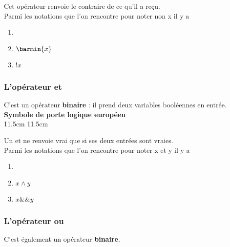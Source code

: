 \documentclass[a5paper,12pt,french]{book}
\begin{document}
Cet opérateur renvoie \og le contraire de ce qu'il a reçu\fg{}.\\
Parmi les notations que l'on rencontre pour noter \og non x\fg{} il y a
\begin{enumerate}[\textbullet]
	\item 	 {}
	\item 	$\barmin{x}$
	\item 	$!x$
\end{enumerate}
\newpage

\subsubsection*{L'opérateur \og et\fg{}}

C'est un opérateur \textbf{binaire} : il prend deux variables booléennes en entrée.\\

{
	\textbf{Symbole de porte logique européen}\\}{11.5cm}
{
	}{11.5cm}

Un \og et\fg{} ne renvoie vrai que si ses deux entrées sont vraies.\\
Parmi les notations que l'on rencontre pour noter \og x et y\fg{} il y a 
\begin{enumerate}[\textbullet]
	\item 	 {}
	\item 	$x\wedge y$	
	\item 	$x \&\& y$
\end{enumerate}

\subsubsection*{L'opérateur \og ou\fg{}}

C'est également un opérateur \textbf{binaire}.\\
\end{document}
